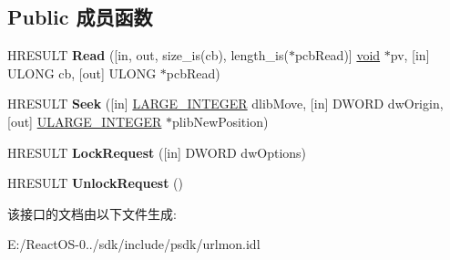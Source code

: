 \subsection*{Public 成员函数}
\begin{DoxyCompactItemize}
\item 
\mbox{\label{interface_i_internet_protocol_aa7e981a9a475c1a1a87f5dc2fa531268}} 
H\+R\+E\+S\+U\+LT {\bfseries Read} (\mbox{[}in, out, size\+\_\+is(cb), length\+\_\+is($\ast$pcb\+Read)\mbox{]} \hyperlink{interfacevoid}{void} $\ast$pv, \mbox{[}in\mbox{]} U\+L\+O\+NG cb, \mbox{[}out\mbox{]} U\+L\+O\+NG $\ast$pcb\+Read)
\item 
\mbox{\label{interface_i_internet_protocol_af548714a367f73646bb836f5e596be54}} 
H\+R\+E\+S\+U\+LT {\bfseries Seek} (\mbox{[}in\mbox{]} \hyperlink{union___l_a_r_g_e___i_n_t_e_g_e_r}{L\+A\+R\+G\+E\+\_\+\+I\+N\+T\+E\+G\+ER} dlib\+Move, \mbox{[}in\mbox{]} D\+W\+O\+RD dw\+Origin, \mbox{[}out\mbox{]} \hyperlink{struct___u_l_a_r_g_e___i_n_t_e_g_e_r}{U\+L\+A\+R\+G\+E\+\_\+\+I\+N\+T\+E\+G\+ER} $\ast$plib\+New\+Position)
\item 
\mbox{\label{interface_i_internet_protocol_af263d91f839739d7be0d75718e7161b5}} 
H\+R\+E\+S\+U\+LT {\bfseries Lock\+Request} (\mbox{[}in\mbox{]} D\+W\+O\+RD dw\+Options)
\item 
\mbox{\label{interface_i_internet_protocol_a7de879f8118e5896506fabdfb3e1d05c}} 
H\+R\+E\+S\+U\+LT {\bfseries Unlock\+Request} ()
\end{DoxyCompactItemize}


该接口的文档由以下文件生成\+:\begin{DoxyCompactItemize}
\item 
E\+:/\+React\+O\+S-\/0../sdk/include/psdk/urlmon.\+idl\end{DoxyCompactItemize}

